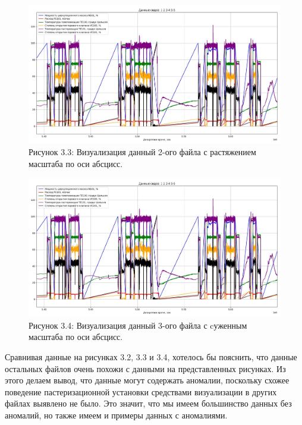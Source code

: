 {  \begin{figure}
    \centering
    \def\svgwidth{\textwidth}
    \includegraphics[width=\textwidth]{images/data_1_visual.jpg}
    \caption*{\gostFont Рисунок 3.3: Визуализация данный 2-ого файла с растяжением масштаба по оси абсцисс.}
    \label{fig:NNBlackBox}
  \end{figure}

  \begin{figure}
    \centering
    \def\svgwidth{\textwidth}
    \includegraphics[width=\textwidth]{images/data_1_visual.jpg}
    \caption*{\gostFont Рисунок 3.4: Визуализация данный 3-ого файла с cуженным масштаба по оси абсцисс.}
    \label{fig:NNBlackBox}
  \end{figure}

  \par \redline Сравнивая данные на рисунках 3.2, 3.3 и 3.4, хотелось бы пояснить, что данные остальных файлов очень похожи с данными на представленных рисунках. Из этого делаем вывод, что данные могут содержать аномалии, поскольку схожее поведение пастеризационной установки средствами визуализации в других файлах выявлено не было. Это значит, что мы имеем большинство данных без аномалий, но также имеем и примеры данных с аномалиями. 

}
